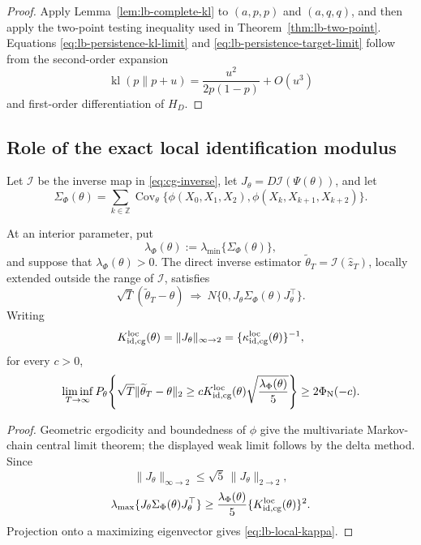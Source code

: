 \begin{proof}
Apply Lemma~\ref{lem:lb-complete-kl} to
\((a,p,p)\) and \((a,q,q)\), and then apply the two-point testing inequality
used in Theorem~\ref{thm:lb-two-point}.  Equations
\eqref{eq:lb-persistence-kl-limit} and
\eqref{eq:lb-persistence-target-limit} follow from the second-order
expansion
\[
 \operatorname{kl}(p\|p+u)
 =\frac{u^2}{2p(1-p)}+O(u^3)
\]
and first-order differentiation of \(H_D\).
\end{proof}

\subsection{Role of the exact local identification modulus}

Let \(\mathcal I\) be the inverse map in \eqref{eq:cg-inverse}, let
\(J_\theta=D\mathcal I(\Psi(\theta))\), and let
\[
 \Sigma_\Phi(\theta)
 =
 \sum_{k\in\mathbb Z}
 \operatorname{Cov}_\theta\{
 \phi(X_0,X_1,X_2),\phi(X_k,X_{k+1},X_{k+2})\}.
\]

\begin{proposition}
\label{prop:lb-local-kappa}
At an interior parameter, put
\[
 \lambda_\Phi(\theta)
 :=\lambda_{\min}\{\Sigma_\Phi(\theta)\},
\]
and suppose that \(\lambda_\Phi(\theta)>0\).  The direct inverse estimator
\(\widetilde\theta_T=\mathcal I(\widehat z_T)\), locally extended outside
the range of \(\mathcal I\), satisfies
\[
 \sqrt T(\widetilde\theta_T-\theta)
 \ \Longrightarrow\
 N\{0,J_\theta\Sigma_\Phi(\theta)J_\theta^\top\}.
\]
Writing
\[
 K_{\rm id,cg}^{\rm loc}(\theta)
 =\|J_\theta\|_{\infty\to2}
 =\{\kappa_{\rm id,cg}^{\rm loc}(\theta)\}^{-1},
\]
for every \(c>0\),
\begin{equation}
 \liminf_{T\to\infty}
 P_\theta\!\left\{
 \sqrt T\|\widetilde\theta_T-\theta\|_2
 \geq
 cK_{\rm id,cg}^{\rm loc}(\theta)
 \sqrt{\frac{\lambda_\Phi(\theta)}5}
 \right\}
 \geq2\Phi_{\rm N}(-c).
 \label{eq:lb-local-kappa}
\end{equation}
\end{proposition}

\begin{proof}
Geometric ergodicity and boundedness of \(\phi\) give the multivariate
Markov-chain central limit theorem; the displayed weak limit follows by the
delta method.  Since
\[
 \|J_\theta\|_{\infty\to2}
 \leq\sqrt5\,\|J_\theta\|_{2\to2},
\]
\[
 \lambda_{\max}\{
 J_\theta\Sigma_\Phi(\theta)J_\theta^\top\}
 \geq
 \frac{\lambda_\Phi(\theta)}5
 \{K_{\rm id,cg}^{\rm loc}(\theta)\}^2.
\]
Projection onto a maximizing eigenvector gives
\eqref{eq:lb-local-kappa}.
\end{proof}

